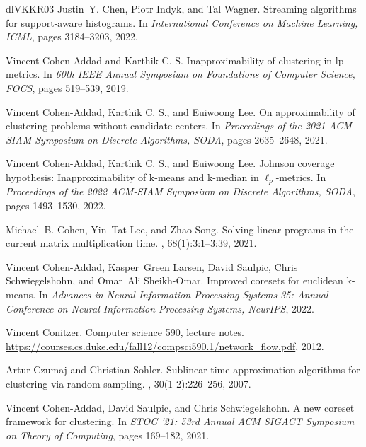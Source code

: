 \documentclass[10pt,a4paper]{amsart}
\begin{document}
\begin{thebibliography}{dlVKKR03}
Justin~Y. Chen, Piotr Indyk, and Tal Wagner.
\newblock Streaming algorithms for support-aware histograms.
\newblock In {\em International Conference on Machine Learning, {ICML}}, pages 3184--3203, 2022.

Vincent Cohen{-}Addad and {Karthik {C. S.}}
\newblock Inapproximability of clustering in lp metrics.
\newblock In {\em 60th {IEEE} Annual Symposium on Foundations of Computer Science, {FOCS}}, pages 519--539, 2019.

Vincent Cohen{-}Addad, {Karthik {C. S.}}, and Euiwoong Lee.
\newblock On approximability of clustering problems without candidate centers.
\newblock In {\em Proceedings of the 2021 {ACM-SIAM} Symposium on Discrete Algorithms, {SODA}}, pages 2635--2648, 2021.

Vincent Cohen{-}Addad, {Karthik {C. S.}}, and Euiwoong Lee.
\newblock Johnson coverage hypothesis: Inapproximability of k-means and k-median in $\ell_p$-metrics.
\newblock In {\em Proceedings of the 2022 {ACM-SIAM} Symposium on Discrete Algorithms, {SODA}}, pages 1493--1530, 2022.

Michael~B. Cohen, Yin~Tat Lee, and Zhao Song.
\newblock Solving linear programs in the current matrix multiplication time.
, 68(1):3:1--3:39, 2021.

Vincent Cohen{-}Addad, Kasper~Green Larsen, David Saulpic, Chris Schwiegelshohn, and Omar~Ali Sheikh{-}Omar.
\newblock Improved coresets for euclidean k-means.
\newblock In {\em Advances in Neural Information Processing Systems 35: Annual Conference on Neural Information Processing Systems, NeurIPS}, 2022.

Vincent Conitzer.
\newblock Computer science 590, lecture notes.
\newblock \url{https://courses.cs.duke.edu/fall12/compsci590.1/network_flow.pdf}, 2012.

Artur Czumaj and Christian Sohler.
\newblock Sublinear-time approximation algorithms for clustering via random sampling.
, 30(1-2):226--256, 2007.

Vincent Cohen{-}Addad, David Saulpic, and Chris Schwiegelshohn.
\newblock A new coreset framework for clustering.
\newblock In {\em {STOC} '21: 53rd Annual {ACM} {SIGACT} Symposium on Theory of Computing}, pages 169--182, 2021.


\end{thebibliography}
\end{document}
